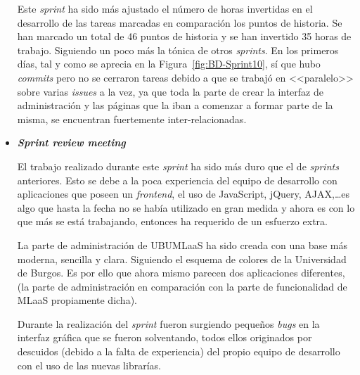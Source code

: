 \begin{itemize}
Este \textit{sprint} ha sido más ajustado el número de horas invertidas en el desarrollo de las tareas marcadas en comparación los puntos de historia. Se han marcado un total de 46 puntos de historia y se han invertido 35 horas de trabajo. Siguiendo un poco más la tónica de otros \textit{sprints}. En los primeros días, tal y como se aprecia en la Figura~\ref{fig:BD-Sprint10}, sí que hubo \textit{commits} pero no se cerraron tareas debido a que se trabajó en <<paralelo>> sobre varias \textit{issues} a la vez, ya que toda la parte de crear la interfaz de administración y las páginas que la iban a comenzar a formar parte de la misma, se encuentran fuertemente inter-relacionadas.

\item \textbf{\textit{Sprint review meeting}}

El trabajo realizado durante este \textit{sprint} ha sido más duro que el de \textit{sprints} anteriores. Esto se debe a la poca experiencia del equipo de desarrollo con aplicaciones que poseen un \textit{frontend}, el uso de JavaScript, jQuery, AJAX,\dots es algo que hasta la fecha no se había utilizado en gran medida y ahora es con lo que más se está trabajando, entonces ha requerido de un esfuerzo extra.

La parte de administración de UBUMLaaS ha sido creada con una base más moderna, sencilla y clara. Siguiendo el esquema de colores de la Universidad de Burgos. Es por ello que ahora mismo parecen dos aplicaciones diferentes, (la parte de administración en comparación con la parte de funcionalidad de MLaaS propiamente dicha).

Durante la realización del \textit{sprint} fueron surgiendo pequeños \textit{bugs} en la interfaz gráfica que se fueron solventando, todos ellos originados por descuidos (debido a la falta de experiencia) del propio equipo de desarrollo con el uso de las nuevas librarías.
\end{itemize}

